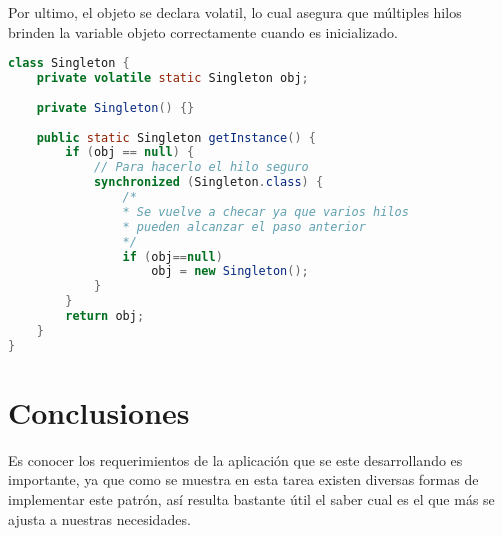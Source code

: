 \documentclass[a4paper,12pt]{article}
\begin{document}
Por ultimo, el objeto se declara volatil, lo cual asegura que múltiples hilos 
brinden la variable objeto correctamente cuando es inicializado.
\begin{lstlisting}[language=Java,style=customJava,basicstyle=\fontfamily{cmss}
\small]
class Singleton { 
    private volatile static Singleton obj; 
  
    private Singleton() {} 
  
    public static Singleton getInstance() { 
        if (obj == null) { 
            // Para hacerlo el hilo seguro
            synchronized (Singleton.class) { 
                /*
                * Se vuelve a checar ya que varios hilos
                * pueden alcanzar el paso anterior
                */
                if (obj==null) 
                    obj = new Singleton(); 
            } 
        } 
        return obj; 
    } 
} 

\end{lstlisting}

\section{Conclusiones}
Es conocer los requerimientos de la aplicación que se este desarrollando es 
importante, ya que como se muestra en esta tarea existen diversas formas de 
implementar este patrón, así resulta bastante útil el saber cual es el que más 
se ajusta a nuestras necesidades.
\end{document}
